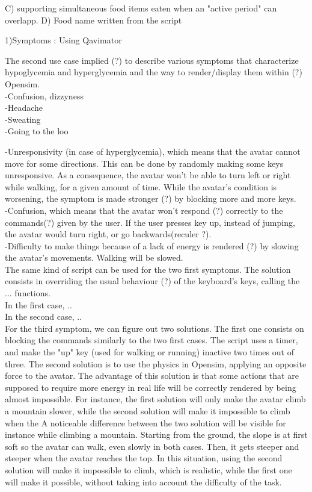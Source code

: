     C) supporting simultaneous food items eaten when an "active period" can overlapp.
    D) Food name written from the script
    
\fi
 
1)Symptoms : Using Qavimator 

The second use case implied (?) to describe various symptoms that characterize hypoglycemia and hyperglycemia and the way to render/display them within (?) Opensim.\\
-Confusion, dizzyness\\
-Headache\\
-Sweating\\
-Going to the loo


-Unresponsivity (in case of hyperglycemia), which means that the avatar cannot move for some directions. This can be done by randomly making some keys unresponsive. 
As a consequence, the avatar won't be able to turn left or right while walking, for a given amount of time. 
While the avatar's condition is worsening, the symptom is made stronger (?) by blocking more and more keys.\\

-Confusion, which means that the avatar won't respond (?) correctly to the commands(?) given by the user. 
If the user presses key up, instead of jumping, the avatar would turn right, or go backwards(reculer ?). \\

-Difficulty to make things because of a lack of energy is rendered (?) by slowing the avatar's movements. Walking will be slowed. \\

The same kind of script can be used for the two first symptoms. The solution consists in overriding the usual behaviour (?) of the keyboard's keys, calling the ... functions. \\
In the first case, ..\\
In the second case, ..\\

For the third symptom, we can figure out two solutions. The first one consists on blocking the commands similarly to the two first cases. The script uses a timer, and make the "up" key (used for walking or running) inactive two times out of three.
The second solution is to use the physics in Opensim, applying an opposite force to the avatar. 
The advantage of this solution is that some actions that are supposed to require more energy in real life will be correctly rendered by being almost impossible. 
For instance, the first solution will only make the avatar climb a mountain slower, while the second solution will make it impossible to climb when the 
A noticeable difference between the two solution will be visible for instance while climbing a mountain. 
Starting from the ground, the slope is at first soft so the avatar can walk, even slowly in both cases. Then, it gets steeper and steeper when the avatar reaches the top. 
In this situation, using the second solution will make it impossible to climb, which is realistic, while the first one will make it possible, without taking into account the difficulty of the task.\\

